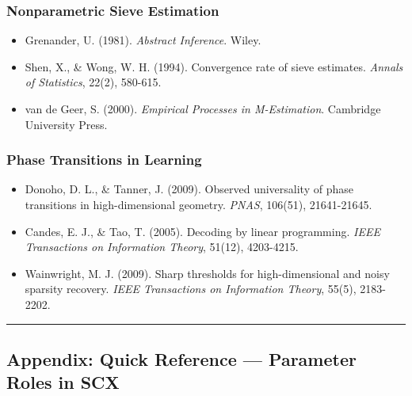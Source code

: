 \documentclass[
  12pt,
]{ctexart}
\providecommand{\tightlist}{%
  \setlength{\itemsep}{0pt}\setlength{\parskip}{0pt}}
\begin{document}
\subsubsection{Nonparametric Sieve
Estimation}\label{nonparametric-sieve-estimation}

\begin{itemize}
\tightlist
\item
  Grenander, U. (1981). \emph{Abstract Inference}. Wiley.
\item
  Shen, X., \& Wong, W. H. (1994). Convergence rate of sieve estimates.
  \emph{Annals of Statistics}, 22(2), 580-615.
\item
  van de Geer, S. (2000). \emph{Empirical Processes in M-Estimation}.
  Cambridge University Press.
\end{itemize}

\subsubsection{Phase Transitions in
Learning}\label{phase-transitions-in-learning}

\begin{itemize}
\tightlist
\item
  Donoho, D. L., \& Tanner, J. (2009). Observed universality of phase
  transitions in high-dimensional geometry. \emph{PNAS}, 106(51),
  21641-21645.
\item
  Candes, E. J., \& Tao, T. (2005). Decoding by linear programming.
  \emph{IEEE Transactions on Information Theory}, 51(12), 4203-4215.
\item
  Wainwright, M. J. (2009). Sharp thresholds for high-dimensional and
  noisy sparsity recovery. \emph{IEEE Transactions on Information
  Theory}, 55(5), 2183-2202.
\end{itemize}

\begin{center}\rule{0.5\linewidth}{0.5pt}\end{center}

\subsection{Appendix: Quick Reference --- Parameter Roles in
SCX}\label{appendix-quick-reference-parameter-roles-in-scx}
\end{document}
